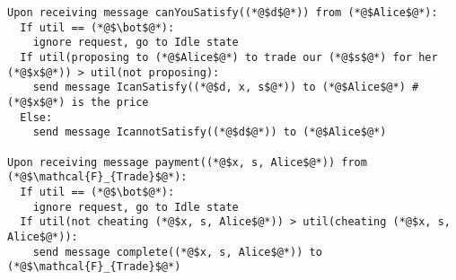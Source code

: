 \begin{lstlisting}[label=satprot, style=numbers]
Upon receiving message canYouSatisfy((*@$d$@*)) from (*@$Alice$@*):
  If util == (*@$\bot$@*):
    ignore request, go to Idle state
  If util(proposing to (*@$Alice$@*) to trade our (*@$s$@*) for her (*@$x$@*)) > util(not proposing):
    send message IcanSatisfy((*@$d, x, s$@*)) to (*@$Alice$@*) # (*@$x$@*) is the price
  Else:
    send message IcannotSatisfy((*@$d$@*)) to (*@$Alice$@*)

Upon receiving message payment((*@$x, s, Alice$@*)) from (*@$\mathcal{F}_{Trade}$@*):
  If util == (*@$\bot$@*):
    ignore request, go to Idle state
  If util(not cheating (*@$x, s, Alice$@*)) > util(cheating (*@$x, s, Alice$@*)):
    send message complete((*@$x, s, Alice$@*)) to (*@$\mathcal{F}_{Trade}$@*)
\end{lstlisting}
